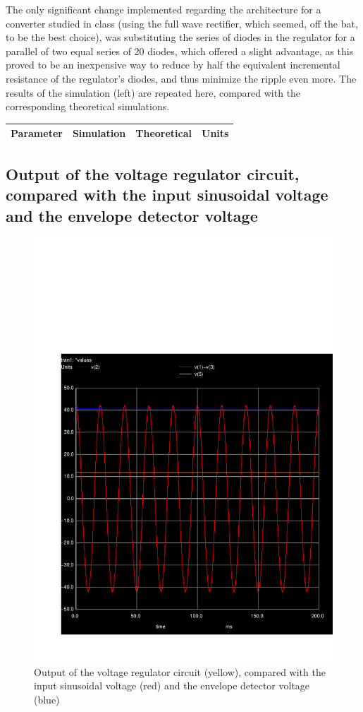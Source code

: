 The only significant change implemented regarding the architecture for a converter studied in class (using the full wave rectifier, which seemed, off the bat, to be the best choice), was substituting the series of diodes in the regulator for a parallel of two equal series of 20 diodes, which offered a slight advantage, as this proved to be an inexpensive way to reduce by half the equivalent incremental resistance of the regulator's diodes, and thus minimize the ripple even more. The results of the simulation (left) are repeated here, compared with the corresponding theoretical simulations.
 
\hfill
 \parbox{1\linewidth}{
  \centering
  \begin{tabular}{|l|l|l|r|}
    {\bf Parameter} & {\bf Simulation} & {\bf Theoretical } & {\bf Units }\\ \hline
    
  \end{tabular}
  \label{tab:results}
  }


  
\subsection{Output of the voltage regulator circuit, compared with the input sinusoidal voltage and the envelope detector voltage}

\par
\begin{figure}[H] \centering
\includegraphics[width=0.6\linewidth]{vs_vout_venv.pdf}
\caption{Output of the voltage regulator circuit (yellow), compared with the input sinusoidal voltage (red) and the envelope detector voltage (blue)}
\label{fig:vs_venv_vout}
\end{figure}


